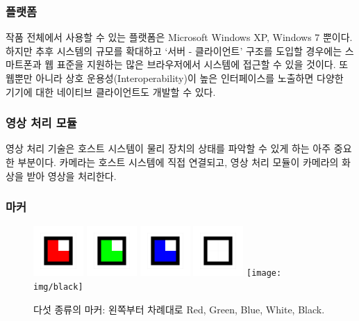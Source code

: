 \documentclass[chapter,11pt,oneside,openany]{xoblivoir}
\begin{document}
\subsubsection{플랫폼}
작품 전체에서 사용할 수 있는 플랫폼은 Microsoft Windows XP, Windows 7 뿐이다.
하지만 추후 시스템의 규모를 확대하고 `서버 - 클라이언트' 구조를 도입할 경우에는
스마트폰과 웹 표준을 지원하는 많은 브라우저에서 시스템에 접근할 수 있을 것이다.
또 웹뿐만 아니라 상호 운용성(Interoperability)이 높은 인터페이스를 노출하면
다양한 기기에 대한 네이티브 클라이언트도 개발할 수 있다.

\subsubsection{영상 처리 모듈}
영상 처리 기술은 호스트 시스템이 물리 장치의 상태를 파악할 수 있게 하는 아주 중요한 부분이다.
카메라는 호스트 시스템에 직접 연결되고, 영상 처리 모듈이 카메라의 화상을 받아 영상을 처리한다.

\subsubsection{마커}
\label{marker}

\begin{figure}[ht]
\centering
\includegraphics[width=0.17\textwidth]{img/red}
\includegraphics[width=0.17\textwidth]{img/green}
\includegraphics[width=0.17\textwidth]{img/blue}
\includegraphics[width=0.17\textwidth]{img/white}
\texttt{[image: img/black]}
\caption[다섯 종류의 마커]{다섯 종류의 마커: 왼쪽부터 차례대로 Red, Green, Blue, White, Black.}
\label{img:marker}
\end{figure}
\end{document}
